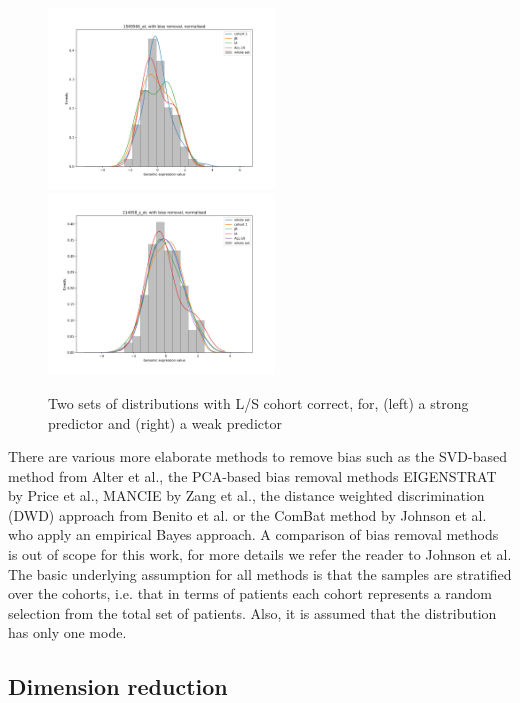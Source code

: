 \documentclass[a4paper,10pt]{article}
\begin{document}
%
\begin{figure}[htp]
\centering
\includegraphics[width=6cm]{images/strong_genome_distribution_withCorrection_standardNormalisation}
\includegraphics[width=6cm]{images/weak_genome_distribution_withCorrection_standardNormalisation}
\caption{Two sets of distributions with L/S cohort correct, for, (left) a strong predictor and (right) a weak predictor}
\label{fig:expression_distribution_cohorts_withBiasCorrection}
\end{figure}
%
There are various more elaborate methods to remove bias such as the SVD-based method from Alter et al.\cite{Alter2000}, the 
PCA-based bias removal methods EIGENSTRAT by Price et al.\cite{Price2006}, MANCIE by Zang et al.\cite{Zang2016}, the distance weighted discrimination (DWD)
approach from Benito et al.\cite{Benito2005} or the ComBat method by Johnson et al.\cite{Johnson2007} who apply an empirical Bayes approach. 
A comparison of bias removal methods is out of scope for this work, for more details we refer the reader to Johnson et al\cite{Johnson2007}.
The basic underlying assumption for all methods is that the samples are stratified over the cohorts, i.e. that in terms
of patients each cohort represents a random selection from the total set of patients. Also, it is assumed that 
the distribution has only one mode.

\subsection{Dimension reduction}
\end{document}

